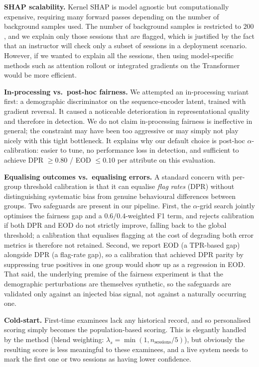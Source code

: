 \documentclass[sigconf]{acmart}
\begin{document}
\textbf{SHAP scalability.} Kernel SHAP is model agnostic but computationally expensive, requiring many forward passes depending on the number of background samples used. The number of background samples is restricted to $200$, and we explain only those sessions that are flagged, which is justified by the fact that an instructor will check only a subset of sessions in a deployment scenario. However, if we wanted to explain all the sessions, then using model-specific methods such as attention rollout or integrated gradients on the Transformer would be more efficient.

\textbf{In-processing vs.\ post-hoc fairness.} We attempted an in-processing variant first: a demographic discriminator on the sequence-encoder latent, trained with gradient reversal. It caused a noticeable deterioration in representational quality and therefore in detection. We do not claim in-processing fairness is ineffective in general; the constraint may have been too aggressive or may simply not play nicely with this tight bottleneck. It explains why our default choice is post-hoc $\alpha$-calibration: easier to tune, no performance loss in detection, and sufficient to achieve DPR $\geq 0.80$ / EOD $\leq 0.10$ per attribute on this evaluation.

\textbf{Equalising outcomes vs.\ equalising errors.} A standard concern with per-group threshold calibration is that it can equalise \emph{flag rates} (DPR) without distinguishing systematic bias from genuine behavioural differences between groups. Two safeguards are present in our pipeline. First, the $\alpha$-grid search jointly optimises the fairness gap and a $0.6/0.4$-weighted F1 term, and rejects calibration if both DPR and EOD do not strictly improve, falling back to the global threshold; a calibration that equalises flagging at the cost of degrading both error metrics is therefore not retained. Second, we report EOD (a TPR-based gap) alongside DPR (a flag-rate gap), so a calibration that achieved DPR parity by suppressing true positives in one group would show up as a regression in EOD. That said, the underlying premise of the fairness experiment is that the demographic perturbations are themselves synthetic, so the safeguards are validated only against an injected bias signal, not against a naturally occurring one.

\textbf{Cold-start.} First-time examinees lack any historical record, and so personalised scoring simply becomes the population-based scoring. This is elegantly handled by the method (blend weighting: $\lambda_s = \min(1, n_{\text{sessions}}/5)$), but obviously the resulting score is less meaningful to these examinees, and a live system needs to mark the first one or two sessions as having lower confidence.
\end{document}
